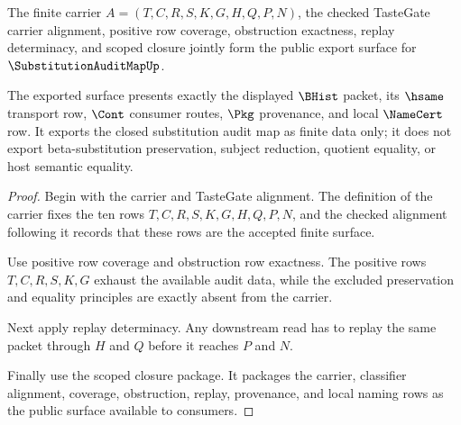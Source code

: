 \begin{theorem}
\label{thm:substitutionauditmap-public-export}
The finite carrier $A=(T,C,R,S,K,G,H,Q,P,N)$, the checked TasteGate carrier alignment, positive row coverage, obstruction exactness, replay determinacy, and scoped closure jointly form the public export surface for $\SubstitutionAuditMapUp$.

The exported surface presents exactly the displayed $\BHist$ packet, its $\hsame$ transport row, $\Cont$ consumer routes, $\Pkg$ provenance, and local $\NameCert$ row. It exports the closed substitution audit map as finite data only; it does not export beta-substitution preservation, subject reduction, quotient equality, or host semantic equality.
\end{theorem}
\begin{proof}
Begin with the carrier and TasteGate alignment. The definition of the carrier fixes the ten rows $T,C,R,S,K,G,H,Q,P,N$, and the checked alignment following it records that these rows are the accepted finite surface.

Use positive row coverage and obstruction row exactness. The positive rows $T,C,R,S,K,G$ exhaust the available audit data, while the excluded preservation and equality principles are exactly absent from the carrier.

Next apply replay determinacy. Any downstream read has to replay the same packet through $H$ and $Q$ before it reaches $P$ and $N$.

Finally use the scoped closure package. It packages the carrier, classifier alignment, coverage, obstruction, replay, provenance, and local naming rows as the public surface available to consumers.
\end{proof}

